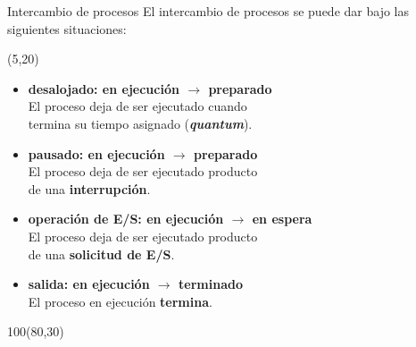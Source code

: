 \documentclass[aspectratio=169]{beamer}
\begin{document}
\begin{frame}[t]{Intercambio de procesos}
    El intercambio de procesos se puede dar bajo las siguientes situaciones:
    \begin{textblock}{80}(5,20) \small
    \begin{itemize}
    \setlength\itemsep{0.3cm}
    \item<2->[-] \textbf{desalojado: {\scriptsize \textcolor{ejecucion}{en ejecución} $\rightarrow$ \textcolor{preparado}{preparado} } }\\
    El proceso deja de ser ejecutado cuando\\ termina su tiempo asignado (\textcolor{verdeuca}{\textbf{\emph{quantum}}}).
    \item<2->[-] \textbf{pausado: {\scriptsize \textcolor{ejecucion}{en ejecución} $\rightarrow$ \textcolor{preparado}{preparado} } }\\
    El proceso deja de ser ejecutado producto\\ de una \textcolor{verdeuca}{\textbf{interrupción}}.
    \item<3->[-] \textbf{operación de E/S: {\scriptsize \textcolor{ejecucion}{en ejecución} $\rightarrow$ \textcolor{espera}{en espera} } }\\
    El proceso deja de ser ejecutado producto\\ de una \textcolor{verdeuca}{\textbf{solicitud de E/S}}.
    \item<4->[-] \textbf{salida: {\scriptsize \textcolor{ejecucion}{en ejecución} $\rightarrow$ \textcolor{terminado}{terminado} } }\\
    El proceso en ejecución \textcolor{verdeuca}{\textbf{termina}}.
    \end{itemize}
    \end{textblock}
    \begin{textblock}{100}(80,30)  \end{textblock}
\end{frame}
\end{document}
